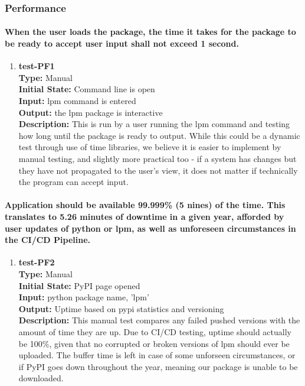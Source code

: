 \documentclass[12pt, titlepage]{article}
\begin{document}
\subsubsection{Performance}
\paragraph{When the user loads the package, the time it takes for the package to be ready
to accept user input shall not exceed 1 second.}
\begin{enumerate}
    \item{\textbf{test-PF1}\\}
    \textbf{Type:} Manual\\
    \textbf{Initial State: } Command line is open\\
    \textbf{Input:} lpm command is entered\\
    \textbf{Output:} the lpm package is interactive \\
    \textbf{Description:} This is run by a user running the lpm command and testing how long until the package is ready to output. While this could be a dynamic test through use of time libraries, we believe it is easier to implement by manual testing, and slightly more practical too - if a system has changes but they have not propagated to the user's view, it does not matter if technically the program can accept input. \\
\end{enumerate}

\paragraph{Application should be available 99.999\% (5 nines) of the time. This translates
to 5.26 minutes of downtime in a given year, afforded by user updates of python or lpm,
as well as unforeseen circumstances in the CI/CD Pipeline.}
\begin{enumerate}
    \item{\textbf{test-PF2}\\}
    \textbf{Type:} Manual\\
    \textbf{Initial State:} PyPI page opened\\
    \textbf{Input:} python package name, 'lpm'\\
    \textbf{Output:} Uptime based on pypi statistics and versioning\\
    \textbf{Description:} This manual test compares any failed pushed versions with the amount of time they are up. Due to CI/CD testing, uptime should actually be 100\%, given that no corrupted or broken versions of lpm should ever be uploaded. The buffer time is left in case of some unforseen circumstances, or if PyPI goes down throughout the year, meaning our package is unable to be downloaded.\\
\end{enumerate}
\end{document}
